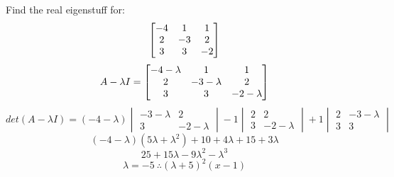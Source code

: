 \begin{example}Find the real eigenstuff for:
\[ \begin{bmatrix}-4 & 1 & 1 \\ 2 & -3 & 2 \\ 3 & 3 & -2\end{bmatrix} \]
\[ A-\lambda I = \begin{bmatrix}-4-\lambda & 1 & 1 \\ 2 & -3-\lambda & 2 \\ 3 & 3 & -2-\lambda\end{bmatrix} \]
\[ det(A-\lambda I) = (-4-\lambda)\begin{vmatrix} -3-\lambda  & 2 \\ 3 & -2-\lambda \end{vmatrix}- 1 \begin{vmatrix} 2 & 2 \\ 3 & -2-\lambda \end{vmatrix} + 1 \begin{vmatrix} 2 & -3-\lambda \\ 3 & 3\end{vmatrix}\]
\[ (-4-\lambda)(5\lambda+\lambda^2) + 10 + 4\lambda + 15 + 3\lambda\]
\[ 25+15\lambda-9\lambda^2-\lambda^3\]
\[ \lambda=-5\ \therefore(\lambda+5)^2(x-1)\]
\end{example}

